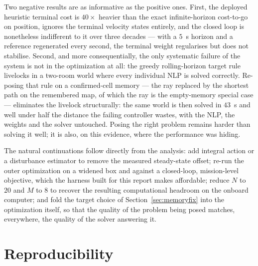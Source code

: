 \documentclass[11pt,a4paper]{article}
\begin{document}
Two negative results are as informative as the positive ones. First, the deployed heuristic terminal cost is
$40\times$ heavier than the exact infinite-horizon cost-to-go on position, ignores the terminal velocity
states entirely, and the closed loop is nonetheless indifferent to it over three decades --- with a $5$~s
horizon and a reference regenerated every second, the terminal weight regularises but does not stabilise.
Second, and more consequentially, the only systematic failure of the system is not in the optimization at all:
the greedy rolling-horizon target rule livelocks in a two-room world where every individual NLP is solved
correctly. Re-posing that rule on a confirmed-cell memory --- the ray replaced by the shortest path on the
remembered map, of which the ray is the empty-memory special case --- eliminates the livelock structurally:
the same world is then solved in $43$~s and well under half the distance the failing controller wastes,
with the NLP, the weights and the solver untouched. Posing the right problem remains harder than solving it well; it is
also, on this evidence, where the performance was hiding.

The natural continuations follow directly from the analysis: add integral action or a disturbance estimator to
remove the measured steady-state offset; re-run the outer optimization on a widened box and against a
closed-loop, mission-level objective, which the harness built for this report makes affordable; reduce
$N$ to $20$ and $M$ to $8$ to recover the resulting computational headroom on the onboard computer; and fold
the target choice of Section~\ref{sec:memoryfix} into the optimization itself, so that the quality of the
problem being posed matches, everywhere, the quality of the solver answering it.

\section*{Reproducibility}
\end{document}
